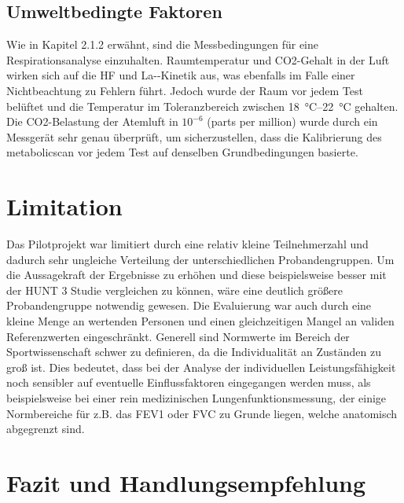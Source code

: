 \subsection{Umweltbedingte Faktoren}

Wie in Kapitel 2.1.2 erwähnt, sind die Messbedingungen für eine Respirationsanalyse einzuhalten. Raumtemperatur und \acs{CO2}-Gehalt in der Luft wirken sich auf die \acs{HF} und \acs{La-}-Kinetik aus, was ebenfalls im Falle einer Nichtbeachtung zu Fehlern führt. Jedoch wurde der Raum vor jedem Test belüftet und die Temperatur im Toleranzbereich zwischen \SIrange{18}{22}{\degreeCelsius} gehalten. Die \acs{CO2}-Belastung der Atemluft in $10^{-6}$ (parts per million) wurde durch ein Messgerät sehr genau überprüft, um sicherzustellen, dass die Kalibrierung des metabolicscan vor jedem Test auf denselben Grundbedingungen basierte.

\section{Limitation}

Das Pilotprojekt war limitiert durch eine relativ kleine Teilnehmerzahl und dadurch sehr ungleiche Verteilung der unterschiedlichen Probandengruppen. Um die Aussagekraft der Ergebnisse zu erhöhen und diese beispielsweise besser mit der HUNT 3 Studie vergleichen zu können, wäre eine deutlich größere Probandengruppe notwendig gewesen. Die Evaluierung war auch durch eine kleine Menge an wertenden Personen und einen gleichzeitigen Mangel an validen Referenzwerten eingeschränkt. Generell sind Normwerte im Bereich der Sportwissenschaft schwer zu definieren, da die Individualität an Zuständen zu groß ist. Dies bedeutet, dass bei der Analyse der individuellen Leistungsfähigkeit noch sensibler auf eventuelle Einflussfaktoren eingegangen werden muss, als beispielsweise bei einer rein medizinischen Lungenfunktionsmessung, der einige Normbereiche für z.B. das \ac{FEV1} oder \ac{FVC} zu Grunde liegen, welche anatomisch abgegrenzt sind.

\section{Fazit und Handlungsempfehlung}

